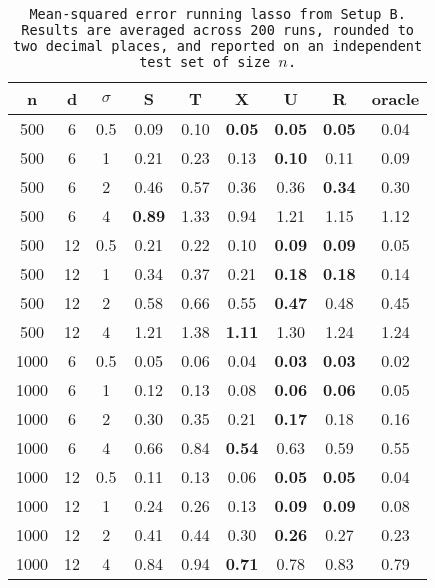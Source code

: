 \begin{table}[ht]
\centering
\begin{tabular}{ccccccccc}
  \hline
n & d & $\sigma$ & S & T & X & U & R & oracle \\ 
  \hline
500 & 6 & 0.5 & 0.09 & 0.10 & \bf 0.05 & \bf  0.05 & \bf 0.05 & 0.04 \\ 
  500 & 6 & 1 & 0.21 & 0.23 & 0.13 & \bf  0.10 & 0.11 & 0.09 \\ 
  500 & 6 & 2 & 0.46 & 0.57 & 0.36 &  0.36 & \bf 0.34 & 0.30 \\ 
  500 & 6 & 4 & \bf 0.89 & 1.33 & 0.94 &  1.21 & 1.15 & 1.12 \\ 
  500 & 12 & 0.5 & 0.21 & 0.22 & 0.10 & \bf  0.09 & \bf 0.09 & 0.05 \\ 
  500 & 12 & 1 & 0.34 & 0.37 & 0.21 & \bf  0.18 & \bf 0.18 & 0.14 \\ 
  500 & 12 & 2 & 0.58 & 0.66 & 0.55 & \bf  0.47 & 0.48 & 0.45 \\ 
  500 & 12 & 4 & 1.21 & 1.38 & \bf 1.11 &  1.30 & 1.24 & 1.24 \\ 
  1000 & 6 & 0.5 & 0.05 & 0.06 & 0.04 & \bf  0.03 & \bf 0.03 & 0.02 \\ 
  1000 & 6 & 1 & 0.12 & 0.13 & 0.08 & \bf  0.06 & \bf 0.06 & 0.05 \\ 
  1000 & 6 & 2 & 0.30 & 0.35 & 0.21 & \bf  0.17 & 0.18 & 0.16 \\ 
  1000 & 6 & 4 & 0.66 & 0.84 & \bf 0.54 &  0.63 & 0.59 & 0.55 \\ 
  1000 & 12 & 0.5 & 0.11 & 0.13 & 0.06 & \bf  0.05 & \bf 0.05 & 0.04 \\ 
  1000 & 12 & 1 & 0.24 & 0.26 & 0.13 & \bf  0.09 & \bf 0.09 & 0.08 \\ 
  1000 & 12 & 2 & 0.41 & 0.44 & 0.30 & \bf  0.26 & 0.27 & 0.23 \\ 
  1000 & 12 & 4 & 0.84 & 0.94 & \bf 0.71 &  0.78 & 0.83 & 0.79 \\ 
   \hline
\end{tabular}
\caption{\tt Mean-squared error running \texttt{lasso} from Setup B. Results are averaged across 200 runs, rounded to two decimal places, and reported on an independent test set of size $n$.} 
\label{table:setup2}
\end{table}
